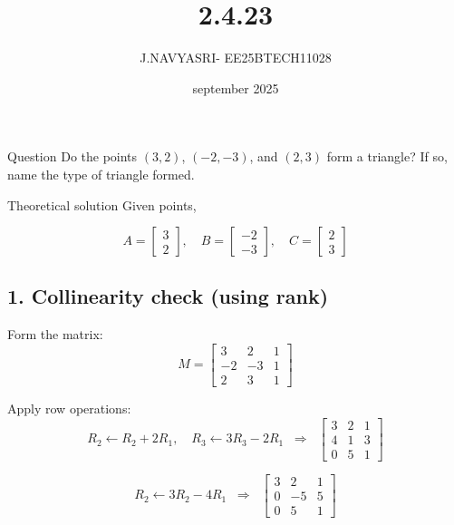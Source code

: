 \documentclass{beamer}
\title %
{2.4.23}
\date{september 2025}
\author %
{J.NAVYASRI- EE25BTECH11028}
\begin{document}
\frame{\titlepage}
\begin{frame}{Question}
Do the points \( (3, 2) \), \( (-2, -3) \), and \( (2, 3) \) form a triangle? If so, name the type of triangle formed.
\end{frame}

\begin{frame}{Theoretical solution}
Given points,

\begin{equation}
A=\begin{bmatrix}3\\2\end{bmatrix}, \quad 
B=\begin{bmatrix}-2\\-3\end{bmatrix}, \quad 
C=\begin{bmatrix}2\\3\end{bmatrix}
\end{equation}

\subsection*{1. Collinearity check (using rank)}

Form the matrix:
\begin{equation}
M=\begin{bmatrix}
3 & 2 & 1\\
-2 & -3 & 1\\
2 & 3 & 1
\end{bmatrix}
\end{equation}

Apply row operations:
\begin{equation}
R_2 \leftarrow R_2+2R_1,\quad R_3 \leftarrow 3R_3-2R_1
\;\;\Rightarrow\;\;
\begin{bmatrix}
3 & 2 & 1\\
4 & 1 & 3\\
0 & 5 & 1
\end{bmatrix}
\end{equation}

\begin{equation}
R_2 \leftarrow 3R_2-4R_1
\;\;\Rightarrow\;\;
\begin{bmatrix}
3 & 2 & 1\\
0 & -5 & 5\\
0 & 5 & 1
\end{bmatrix}
\end{equation}
\end{frame}
\end{document}
